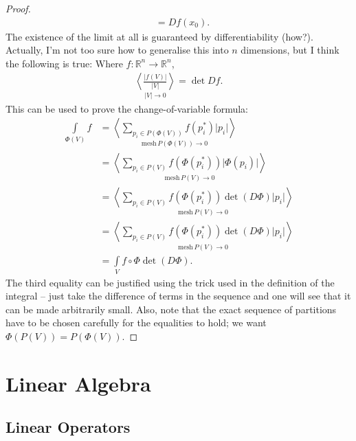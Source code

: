 \documentclass{article}
\newcommand{\lv}[1]{\lvert #1\rvert}
\newcommand{\seq}[2]{\underset{#2}{\left\langle #1\right\rangle}}
\theoremstyle{definition}
\begin{document}
\begin{proof}
\begin{align*}
		&=Df(x_0).
	\end{align*}
	The existence of the limit at all is guaranteed by differentiability (how?).
	Actually, I'm not too sure how to generalise this into $n$ dimensions, but I think the following is true:
	Where $f:\mathbb{R}^n\rightarrow\mathbb{R}^n$, 
	\begin{align*}
		\seq{\frac{\lv{f(V)}}{\lv{V}}}{\lv{V}\rightarrow0}=\det Df.
	\end{align*}
	This can be used to prove the change-of-variable formula:
	\begin{align*}
		\int\limits_{\Phi(V)}f&=\seq{\sum_{p_i\in P(\Phi(V))}f(p_i^*)\lv{p_i}}{\text{mesh}\,P(\Phi(V))\rightarrow0}\\
		&=\seq{\sum_{p_i\in P(V)}f(\Phi(p_i^*))\lv{\Phi(p_i)}}{\text{mesh}\,P(V)\rightarrow0}\\
		&=\seq{\sum_{p_i\in P(V)}f(\Phi(p_i^*))\det(D\Phi)\lv{p_i}}{\text{mesh}\,P(V)\rightarrow0}\\
		&=\seq{\sum_{p_i\in P(V)}f(\Phi(p_i^*))\det(D\Phi)\lv{p_i}}{\text{mesh}\,P(V)\rightarrow0}\\
		&=\int\limits_Vf\circ\Phi\det(D\Phi).
	\end{align*}
	The third equality can be justified using the trick used in the definition of the integral -- just take the difference of terms in the sequence and one will see that it can be made arbitrarily small. Also, note that the exact sequence of partitions have to be chosen carefully for the equalities to hold; we want $\Phi(P(V))=P(\Phi(V)).$
\end{proof}


\section{Linear Algebra}
\subsection{Linear Operators}
\end{document}
